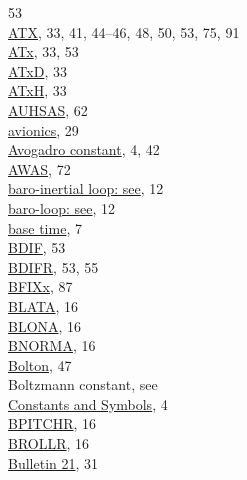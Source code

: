 \documentclass[
  english,
]{book}
\begin{document}
53\\
\href{./4-the-state-of-the-atmosphere.html\#ambient-t}{ATX}, 33, 41,
44--46, 48, 50, 53, 75, 91\\
\href{./4-the-state-of-the-atmosphere.html\#ambient-t}{ATx}, 33, 53\\
\href{./4-the-state-of-the-atmosphere.html\#ambient-t}{ATxD}, 33\\
\href{./4-the-state-of-the-atmosphere.html\#ambient-t}{ATxH}, 33\\
\href{./5-cloud-physics-variables.html\#CRPC}{AUHSAS}, 62\\
\href{./4-the-state-of-the-atmosphere.html\#psx}{avionics}, 29\\
\href{./1-introduction.html\#constants-and-symbols}{Avogadro constant},
4, 42\\
\href{./6-air-chemistry-measurements.html\#awas-cims-qcls-toga}{AWAS},
72\\
\href{./3-the-state-of-the-aircraft.html\#wp3}{baro-inertial loop: see},
12\\
\href{./3-the-state-of-the-aircraft.html\#wp3}{baro-loop: see}, 12\\
\href{./2-general-information-about-data-files.html\#base-time}{base
time}, 7\\
\href{./4-the-state-of-the-atmosphere.html\#bdifr}{BDIF}, 53\\
\href{./4-the-state-of-the-atmosphere.html\#bdifr}{BDIFR}, 53, 55\\
\href{./10-obsolete-variables.html\#vanes}{BFIXx}, 87\\
\href{./3-the-state-of-the-aircraft.html\#blata}{BLATA}, 16\\
\href{./3-the-state-of-the-aircraft.html\#blona}{BLONA}, 16\\
\href{./3-the-state-of-the-aircraft.html\#bnorma}{BNORMA}, 16\\
\href{./3-the-state-of-the-aircraft.html\#thetae}{Bolton}, 47\\
Boltzmann constant, see\\
\hspace*{0.333em}\hspace*{0.333em}\href{./1-introduction.html\#constants-and-symbols}{Constants
and Symbols}, 4\\
\href{./3-the-state-of-the-aircraft.html\#bpitchr}{BPITCHR}, 16\\
\href{./3-the-state-of-the-aircraft.html\#brollr}{BROLLR}, 16\\
\href{./4-the-state-of-the-atmosphere.html\#qcx}{Bulletin 21}, 31\\
\end{document}
